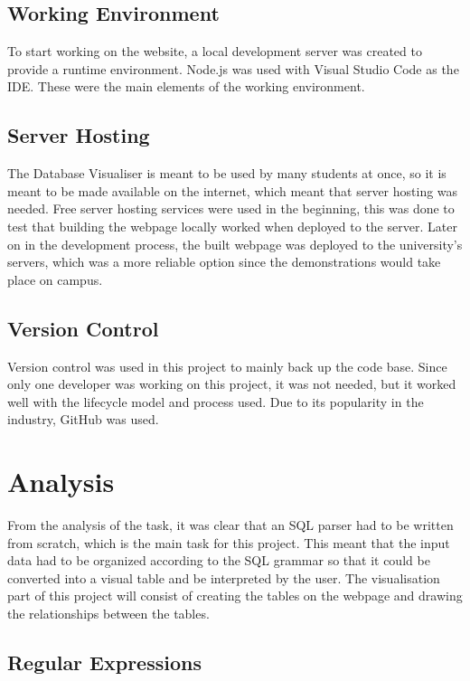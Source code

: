 \subsection{Working Environment}

To start working on the website, a local development server was created to provide a runtime environment. Node.js was used with Visual Studio Code \cite{Code} as the IDE. These were the main elements of the working environment.

\subsection{Server Hosting}

The Database Visualiser is meant to be used by many students at once, so it is meant to be made available on the internet, which meant that server hosting was needed. Free server hosting services\cite{Infinity} were used in the beginning, this was done to test that building the webpage locally worked when deployed to the server. Later on in the development process, the built webpage was deployed to the university's servers, which was a more reliable option since the demonstrations would take place on campus.

\subsection{Version Control}

Version control was used in this project to mainly back up the code base. Since only one developer was working on this project, it was not needed, but it worked well with the lifecycle model and process used. Due to its popularity in the industry, GitHub \cite{Github} was used.

\section{Analysis}

From the analysis of the task, it was clear that an SQL parser had to be written from scratch, which is the main task for this project. This meant that the input data had to be organized according to the SQL grammar so that it could be converted into a visual table and be interpreted by the user. The visualisation part of this project will consist of creating the tables on the webpage and drawing the relationships between the tables.

\subsection{Regular Expressions}

